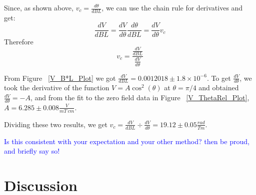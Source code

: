 \documentclass[prb,preprint]{revtex4-1}
\begin{document}
Since, as shown above, $v_c = \frac{d \theta}{dBL}$, we can use the chain rule for derivatives and get: 
\begin{equation}
\frac{ dV}{ dBL} = \frac{dV}{d\theta} \frac{d\theta}{dBL} = \frac{dV}{d\theta} v_c
\end{equation}
Therefore 
\begin{equation} 
v_c = \frac{\frac{dV}{dBL}}{\frac{dV}{d\theta}}
\end{equation}

From Figure ~\ref{V_B*L_Plot} we got $\frac{dV}{dBL} = 0.0012018 \pm 1.8 \times 10^{-6}$. To get $\frac{dV}{d\theta}$, we took the derivative of the function $V = A \cos^{2}(\theta)$ at $\theta = \pi/4$ and obtained $\frac{dV}{d\theta} = -A$, and from the fit to the zero field data in Figure ~\ref{V_ThetaRel_Plot}, $A = 6.285 \pm 0.008 \frac{V}{mT\ cm}$.  

Dividing these two results, we get $v_c = \frac{dV}{dBL} \div \frac{dV}{d\theta} = 19.12 \pm 0.05 \frac{rad}{Tm}$.  

\textcolor{blue}{Is this consistent with your expectation and your other method?  then be proud, and briefly say so! } 





\section{Discussion}
\end{document}
